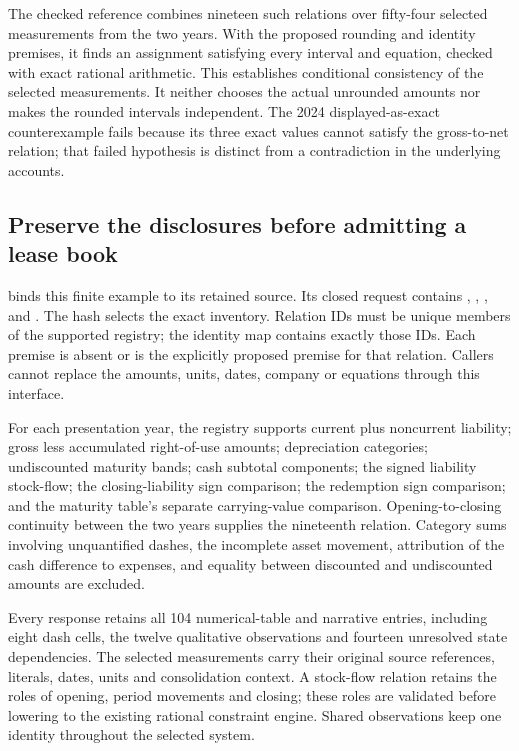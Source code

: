 The checked reference combines nineteen such relations over fifty-four
selected measurements from the two years. With the proposed rounding and
identity premises, it finds an assignment satisfying every interval and
equation, checked with exact rational arithmetic. This establishes conditional
consistency of the selected measurements. It neither chooses the actual
unrounded amounts nor makes the rounded intervals independent. The 2024
displayed-as-exact counterexample fails because its three exact values cannot
satisfy the gross-to-net relation; that failed hypothesis is distinct from a
contradiction in the underlying accounts.

\subsection{Preserve the disclosures before admitting a lease book}

 binds this finite example to its retained
source. Its closed request contains , ,
,  and
. The hash selects the exact inventory. Relation IDs
must be unique members of the supported registry; the identity map contains
exactly those IDs. Each premise is absent or is the explicitly proposed
premise for that relation. Callers cannot replace the amounts, units, dates,
company or equations through this interface.

For each presentation year, the registry supports current plus noncurrent
liability; gross less accumulated right-of-use amounts; depreciation categories;
undiscounted maturity bands; cash subtotal components; the signed liability
stock-flow; the closing-liability sign comparison; the redemption sign
comparison; and the maturity table's separate carrying-value comparison.
Opening-to-closing continuity between the two years supplies the nineteenth
relation. Category sums involving unquantified dashes, the incomplete asset
movement, attribution of the cash difference to expenses, and equality between
discounted and undiscounted amounts are excluded.

Every response retains all 104 numerical-table and narrative entries, including
eight dash cells, the twelve qualitative observations and fourteen unresolved
state dependencies. The selected measurements carry their original source
references, literals, dates, units and consolidation context. A stock-flow
relation retains the roles of opening, period movements and closing; these
roles are validated before lowering to the existing rational constraint engine.
Shared observations keep one identity throughout the selected system.

